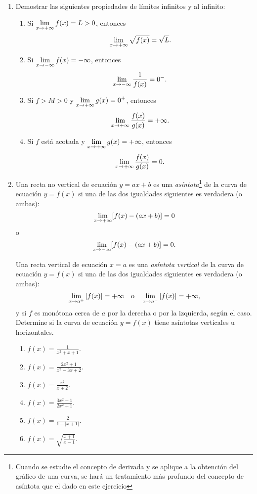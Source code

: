 \begin{multicols}{2}
\begin{enumerate}[leftmargin=*]
\item Demostrar las siguientes propiedades de límites infinitos y al infinito:
      \begin{enumerate}[leftmargin=*]
      \item Si $\displaystyle \limjc{f(x)}{x}{+\infty} = L > 0$, entonces
      \[
          \limjc{\sqrt{f(x)}}{x}{+\infty} = \sqrt{L}.
      \]

      \item Si $\displaystyle \limjc{f(x)}{x}{-\infty} = -\infty$, entonces
      \[
          \limjc{\frac{1}{f(x)}}{x}{-\infty} = 0^-.
      \]

      \item Si $f > M > 0$ y $\displaystyle \limjc{g(x)}{x}{+\infty} = 0^+$, entonces
      \[
          \limjc{\frac{f(x)}{g(x)}}{x}{+\infty} = +\infty.
      \]

      \item Si $f$ está acotada y $\displaystyle \limjc{g(x)}{x}{+\infty} = +\infty$,
          entonces
      \[
            \limjc{\frac{f(x)}{g(x)}}{x}{+\infty} = 0.
      \]
      \end{enumerate}

  \item Una recta no vertical de ecuación $y = ax + b$ es una \emph{asíntota}\footnote{Cuando
      se estudie el concepto de derivada y se aplique a la obtención del gráfico de una curva,
      se hará un tratamiento más profundo del concepto de asíntota que el dado en este
      ejercicio} de la curva de ecuación $y = f(x)$ si una de las dos igualdades siguientes es
      verdadera (o ambas):
      \[
          \limjc{[f(x) - (ax + b)]}{x}{+\infty} = 0
      \]
      o
      \[
      \limjc{[f(x) - (ax + b)]}{x}{-\infty} = 0.
      \]

      Una recta vertical de ecuación $x = a$ es una \emph{asíntota vertical} de la curva de
      ecuación $y = f(x)$ si una de las dos igualdades siguientes es verdadera (o ambas):
      \[
          \limjc{|f(x)|}{x}{a^+} = +\infty \quad\text{o}\quad
          \limjc{|f(x)|}{x}{a^-} = +\infty,
      \]
      y si $f$ es monótona cerca de $a$ por la derecha o por la izquierda, según el caso.
      Determine si la curva de ecuación $y = f(x)$ tiene asíntotas verticales u horizontales.
            \begin{enumerate}
            \item $\displaystyle f(x)=\frac{1}{x^2+x+1}$.
            \item $\displaystyle f(x)=\frac{2x^2+1}{x^2-3x+2}$.
            \item $\displaystyle f(x)=\frac{x^2}{x+2}$.
            \item $\displaystyle f(x)=\frac{3x^2-1}{2x^2+1}$.
            \item $\displaystyle f(x)=\frac{2}{1- |x+1|}$.
            \item $\displaystyle f(x)=\sqrt{\frac{x+1}{x-1}}$.
            \end{enumerate}


\end{enumerate}
\end{multicols}
